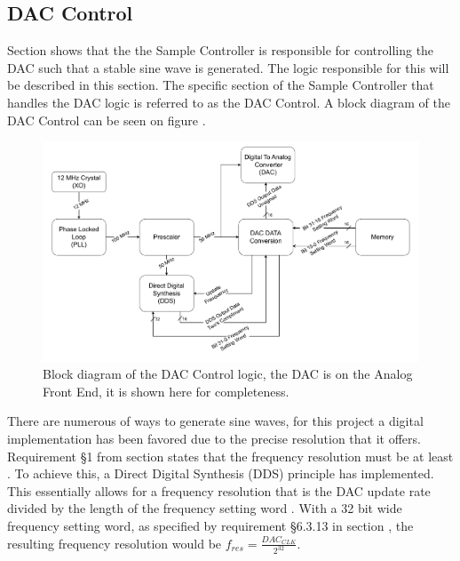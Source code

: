 \subsection{DAC Control} \label{subsec:DAC_CONTROL} 
Section  shows that the the Sample Controller is responsible for controlling the DAC such that a stable sine wave is generated. The logic responsible for this will be described in this section. The specific section of the Sample Controller that handles the DAC logic is referred to as the DAC Control. A block diagram of the DAC Control can be seen on figure .

\begin{figure}[H]
    \centering
    \includegraphics[clip, trim=0 0 0 0, width=1\textwidth]{Sections/7_SystemDesign/Figures/7_2_3_DAC_CONTROL.pdf}
    \caption{Block diagram of the DAC Control logic, the DAC is on the Analog Front End, it is shown here for completeness.}
    \label{fig:7_2_3_DAC_CONTROL}
\end{figure}

There are numerous of ways to generate sine waves, for this project a digital implementation has been favored due to the precise resolution that it offers. Requirement §1 from section  states that the frequency resolution must be at least . To achieve this, a Direct Digital Synthesis (DDS) principle has implemented. This essentially allows for a frequency resolution that is the DAC update rate divided by the length of the frequency setting word \cite{Fundamentals_DDS}. With a 32 bit wide frequency setting word, as specified by requirement §6.3.13 in section , the resulting frequency resolution would be $f_{res} = \frac{DAC_{CLK}}{2^{32}}$.

